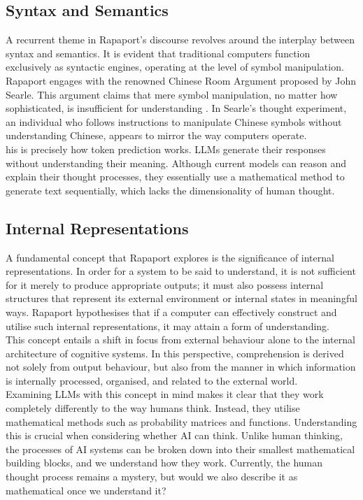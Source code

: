 \documentclass[runningheads]{llncs}
\begin{document}
\subsection{Syntax and Semantics}
%
A recurrent theme in Rapaport's discourse revolves around the interplay between syntax and semantics. It is evident that traditional computers function exclusively as syntactic engines, operating at the level of symbol manipulation.
\\
Rapaport engages with the renowned Chinese Room Argument proposed by John Searle. This argument claims that mere symbol manipulation, no matter how sophisticated, is insufficient for understanding 
\cite{rapaport}. 
In Searle's thought experiment, an individual who follows instructions to manipulate Chinese symbols without understanding Chinese, appears to mirror the way computers operate.
\\
his is precisely how token prediction works. LLMs generate their responses without understanding their meaning. Although current models can reason and explain their thought processes, they essentially use a mathematical method to generate text sequentially, which lacks the dimensionality of human thought.
%
%
\subsection{Internal Representations}
%
A fundamental concept that Rapaport explores is the significance of internal representations. In order for a system to be said to understand, it is not sufficient for it merely to produce appropriate outputs; it must also possess internal structures that represent its external environment or internal states in meaningful ways. Rapaport hypothesises that if a computer can effectively construct and utilise such internal representations, it may attain a form of understanding.
\\
This concept entails a shift in focus from external behaviour alone to the internal architecture of cognitive systems. In this perspective, comprehension is derived not solely from output behaviour, but also from the manner in which information is internally processed, organised, and related to the external world.
\\
Examining LLMs with this concept in mind makes it clear that they work completely differently to the way humans think. Instead, they utilise mathematical methods such as probability matrices and functions. Understanding this is crucial when considering whether AI can think. Unlike human thinking, the processes of AI systems can be broken down into their smallest mathematical building blocks, and we understand how they work. Currently, the human thought process remains a mystery, but would we also describe it as mathematical once we understand it?
%
%
\end{document}
